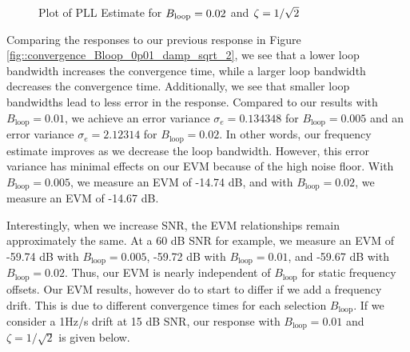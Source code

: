 \documentclass{article}
\begin{document}
\begin{figure}[H]
	\centerline{}
	\caption{Plot of PLL Estimate for $\protect{B_\text{loop}} = 0.02$ and $\protect{\zeta = 1/\sqrt{2}}$}
	\label{fig::convergence_Bloop_0p02_damp_sqrt_2}
\end{figure}

\noindent Comparing the responses to our previous response in Figure \ref{fig::convergence_Bloop_0p01_damp_sqrt_2}, we see that a lower loop bandwidth increases the convergence time, while a larger loop bandwidth decreases the convergence time. Additionally, we see that smaller loop bandwidths lead to less error in the response. Compared to our results with $B_{\text{loop}} = 0.01$, we achieve an error variance $\sigma_e=0.134348$ for $B_{\text{loop}} = 0.005$ and an error variance $\sigma_e=2.12314$ for $B_{\text{loop}} = 0.02$. In other words, our frequency estimate improves as we decrease the loop bandwidth. However, this error variance has minimal effects on our EVM because of the high noise floor. With $B_{\text{loop}} = 0.005$, we measure an EVM of -14.74 dB, and with $B_{\text{loop}} = 0.02$, we measure an EVM of -14.67 dB. 

Interestingly, when we increase SNR, the EVM relationships remain approximately the same. At a 60 dB SNR for example, we measure an EVM of -59.74 dB with $B_{\text{loop}} = 0.005$, -59.72 dB with $B_{\text{loop}} = 0.01$, and -59.67 dB with $B_{\text{loop}} = 0.02$. Thus, our EVM is nearly independent of $B_{\text{loop}}$ for static frequency offsets. Our EVM results, however do to start to differ if we add a frequency drift. This is due to different convergence times for each selection $B_{\text{loop}}$. If we consider a 1Hz/s drift at 15 dB SNR, our response with $B_{\text{loop}} = 0.01$ and $\zeta = 1/\sqrt{2}$ is given below.
\end{document}
